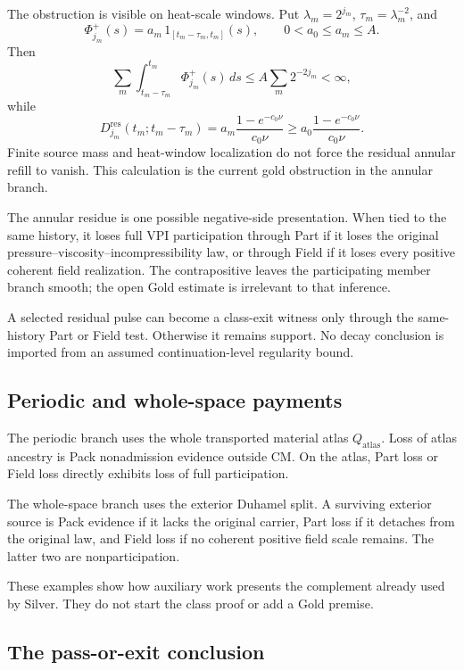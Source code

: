 The obstruction is visible on heat-scale windows.  Put \(\lambda_m=2^{j_m}\), \(\tau_m=\lambda_m^{-2}\), and
\[
  \Phi_{j_m}^+(s)=a_m\,1_{[t_m-\tau_m,t_m]}(s),
  \qquad 0<a_0\le a_m\le A.
\]
Then
\[
  \sum_m\int_{t_m-\tau_m}^{t_m}\Phi_{j_m}^+(s)\,ds
  \le A\sum_m2^{-2j_m}<\infty,
\]
while
\[
  D_{j_m}^{\mathrm{res}}(t_m;t_m-\tau_m)
  =
  a_m\frac{1-e^{-c_0\nu}}{c_0\nu}
  \ge a_0\frac{1-e^{-c_0\nu}}{c_0\nu}.
\]
Finite source mass and heat-window localization do not force the residual annular refill to vanish.  This calculation is the current gold obstruction in the annular branch.

The annular residue is one possible negative-side presentation.  When tied to
the same history, it loses full VPI participation through Part if it loses the
original pressure--viscosity--incompressibility law, or through Field if it
loses every positive coherent field realization.  The contrapositive leaves
the participating member branch smooth; the open Gold estimate is irrelevant
to that inference.

A selected residual pulse can become a class-exit witness only through the
same-history Part or Field test.  Otherwise it remains support.  No decay
conclusion is imported from an assumed continuation-level regularity bound.

\subsection{Periodic and whole-space payments}

The periodic branch uses the whole transported material atlas
\(Q_{\mathrm{atlas}}\).  Loss of atlas ancestry is Pack nonadmission evidence
outside CM.  On the atlas, Part loss or Field loss directly exhibits loss of
full participation.

The whole-space branch uses the exterior Duhamel split.  A surviving exterior
source is Pack evidence if it lacks the original carrier, Part loss if it
detaches from the original law, and Field loss if no coherent positive field
scale remains.  The latter two are nonparticipation.

These examples show how auxiliary work presents the complement already used by
Silver.  They do not start the class proof or add a Gold premise.

\subsection{The pass-or-exit conclusion}

